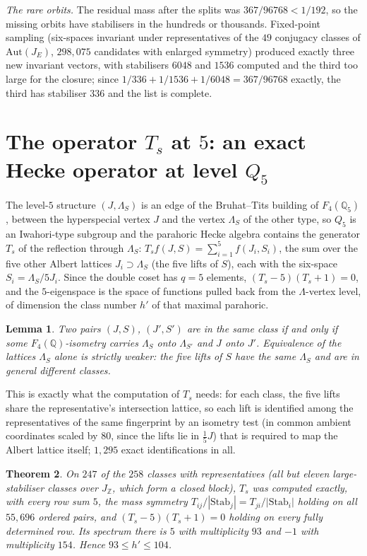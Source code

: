 \documentclass[11pt]{article}
\newtheorem{theorem}{Theorem}[section]\newtheorem{lemma}[theorem]{Lemma}\newtheorem{proposition}[theorem]{Proposition}
\theoremstyle{definition}\newtheorem{computation}[theorem]{Computation}\newtheorem{remark}[theorem]{Remark}\newtheorem{prediction}[theorem]{Prediction}
\newcommand{\Z}{\mathbb Z}\newcommand{\Q}{\mathbb Q}\newcommand{\F}{\mathbb F}\newcommand{\Ff}{F_4}\newcommand{\Aut}{\mathrm{Aut}}\newcommand{\Stab}{\mathrm{Stab}}
\begin{document}
\emph{The rare orbits.} The residual mass after the splits was $367/96768<1/192$, so the missing orbits have stabilisers in the hundreds or thousands. Fixed-point sampling (six-spaces invariant under representatives of the $49$ conjugacy classes of $\Aut(J_E)$, $298{,}075$ candidates with enlarged symmetry) produced exactly three new invariant vectors, with stabilisers $6048$ and $1536$ computed and the third too large for the closure; since $1/336+1/1536+1/6048=367/96768$ exactly, the third has stabiliser $336$ and the list is complete.

\section{The operator $T_s$ at $5$: an exact Hecke operator at level $Q_5$}
The level-$5$ structure $(J,\Lambda_S)$ is an edge of the Bruhat--Tits building of $\Ff(\Q_5)$, between the hyperspecial vertex $J$ and the vertex $\Lambda_S$ of the other type, so $Q_5$ is an Iwahori-type subgroup and the parahoric Hecke algebra contains the generator $T_s$ of the reflection through $\Lambda_S$: $T_sf(J,S)=\sum_{i=1}^{5}f(J_i,S_i)$, the sum over the five other Albert lattices $J_i\supset\Lambda_S$ (the five lifts of $S$), each with the six-space $S_i=\Lambda_S/5J_i$. Since the double coset has $q=5$ elements, $(T_s-5)(T_s+1)=0$, and the $5$-eigenspace is the space of functions pulled back from the $\Lambda$-vertex level, of dimension the class number $h'$ of that maximal parahoric.
\begin{lemma}\label{lem:pair}
Two pairs $(J,S)$, $(J',S')$ are in the same class if and only if some $\Ff(\Q)$-isometry carries $\Lambda_S$ onto $\Lambda_{S'}$ \emph{and} $J$ onto $J'$. Equivalence of the lattices $\Lambda_S$ alone is strictly weaker: the five lifts of $S$ have the same $\Lambda_S$ and are in general different classes.
\end{lemma}
This is exactly what the computation of $T_s$ needs: for each class, the five lifts share the representative's intersection lattice, so each lift is identified among the representatives of the same fingerprint by an isometry test (in common ambient coordinates scaled by $80$, since the lifts lie in $\tfrac15J$) that is required to map the Albert lattice itself; $1{,}295$ exact identifications in all.
\begin{theorem}\label{thm:Ts}
On $247$ of the $258$ classes with representatives (all but eleven large-stabiliser classes over $J_\Z$, which form a closed block), $T_s$ was computed exactly, with every row sum $5$, the mass symmetry $T_{ij}/|\Stab_j|=T_{ji}/|\Stab_i|$ holding on all $55{,}696$ ordered pairs, and $(T_s-5)(T_s+1)=0$ holding on every fully determined row. Its spectrum there is $5$ with multiplicity $93$ and $-1$ with multiplicity $154$. Hence $93\le h'\le 104$.
\end{theorem}
\end{document}
